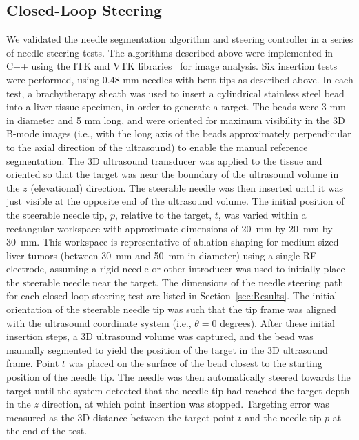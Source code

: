 \subsection{Closed-Loop Steering}
We validated the needle segmentation algorithm and steering controller in a series of needle steering tests. The algorithms described above were implemented in C++ using the ITK and VTK libraries~\cite{ITK2002} for image analysis. Six insertion tests were performed, using 0.48-mm needles with bent tips as described above. In each test, a brachytherapy sheath was used to insert a cylindrical stainless steel bead into a liver tissue specimen, in order to generate a target. The beads were 3 mm in diameter and 5 mm long, and were oriented for maximum visibility in the 3D B-mode images (i.e., with the long axis of the beads approximately perpendicular to the axial direction of the ultrasound) to enable the manual reference segmentation. The 3D ultrasound transducer was applied to the tissue and oriented so that the target was near the boundary of the ultrasound volume in the $z$ (elevational) direction. The steerable needle was then inserted until it was just visible at the opposite end of the ultrasound volume. The initial position of the steerable needle tip, ${p}$, relative to the target, ${t}$, was varied within a rectangular workspace with approximate dimensions of 20~mm by 20~mm by 30~mm. This workspace is representative of ablation shaping for medium-sized liver tumors (between 30~mm and 50~mm in diameter) using a single RF electrode, assuming a rigid needle or other introducer was used to initially place the steerable needle near the target. The dimensions of the needle steering path for each closed-loop steering test are listed in Section~\ref{sec:Results}. The initial orientation of the steerable needle tip was such that the tip frame was aligned with the ultrasound coordinate system (i.e., $\theta = 0$ degrees). After these initial insertion steps, a 3D ultrasound volume was captured, and the bead was manually segmented to yield the position of the target in the 3D ultrasound frame. Point ${t}$ was placed on the surface of the bead closest to the starting position of the needle tip. The needle was then automatically steered towards the target until the system detected that the needle tip had reached the target depth in the $z$ direction, at which point insertion was stopped. Targeting error was measured as the 3D distance between the target point ${t}$ and the needle tip ${p}$ at the end of the test.

